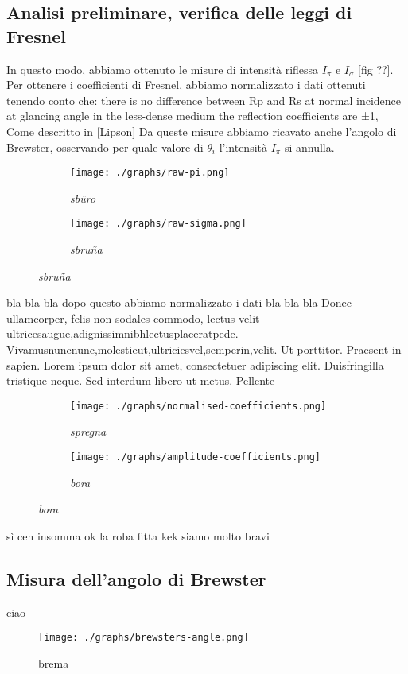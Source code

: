 \subsection{Analisi preliminare, verifica delle leggi di Fresnel}\label{subsec:analisi-dati}
  In questo modo, abbiamo ottenuto le misure di intensità riflessa $I_\pi$ e $I_\sigma$ [fig ??]. Per ottenere i
  coefficienti di Fresnel, abbiamo normalizzato i dati ottenuti tenendo conto che:
  there is no difference between Rp and Rs at normal incidence
  at glancing angle in the less-dense medium the reflection coefficients are ±1,
  Come descritto in [Lipson]
  Da queste misure abbiamo ricavato anche l’angolo di Brewster, osservando per quale valore di $\theta_i$
  l’intensità $I_\pi$ si annulla.

  \begin{figure}[h]
    \centering
    \caption{Sburino}
    \begin{subfigure}{.4\textwidth}
      \texttt{[image: ./graphs/raw-pi.png]}
      \caption{
        \emph{
          sbüro
        }
      }
      \label{fig:raw-pi}
    \end{subfigure}%
    \hspace{20mm}
    \begin{subfigure}{.4\textwidth}
      \texttt{[image: ./graphs/raw-sigma.png]}
      \caption{
        \emph{
          sbruña
        }
      }
      \label{fig:raw-sigma}
    \end{subfigure}
  \end{figure}
  bla bla bla dopo questo abbiamo normalizzato i dati bla bla bla
  Donec ullamcorper, felis non sodales commodo, lectus velit ultricesaugue,adignissimnibhlectusplaceratpede. Vivamusnuncnunc,molestieut,ultriciesvel,semperin,velit. Ut porttitor. Praesent in sapien. Lorem ipsum dolor sit amet, consectetuer adipiscing elit. Duisfringilla tristique neque. Sed interdum libero ut metus. Pellente
  \begin{figure}[h]
    \centering
    \caption{Smegma}
    \begin{subfigure}{.4\textwidth}
      \texttt{[image: ./graphs/normalised-coefficients.png]}
      \caption{
        \emph{
          spregna
        }
      }
      \label{fig:normalised-coefficients}
    \end{subfigure}%
    \hspace{20mm}
    \begin{subfigure}{.4\textwidth}
      \texttt{[image: ./graphs/amplitude-coefficients.png]}
      \caption{
        \emph{
          bora
        }
      }
      \label{fig:raw-sigma}
    \end{subfigure}
  \end{figure}
  sì ceh insomma ok la roba fitta kek siamo molto bravi


\subsection{Misura dell'angolo di Brewster}\label{subsec:angolo-di-brewster}
  \blindtext[1]
  ciao
  \begin{figure}[h]
    \centering
    \caption{brema}
    \texttt{[image: ./graphs/brewsters-angle.png]}
    \label{fig:brewsters-angel}
  \end{figure}
\endinput



